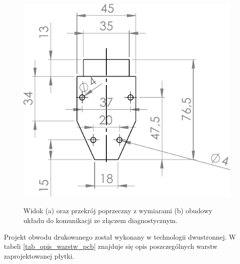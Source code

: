 \documentclass[12pt]{article} %
\numberwithin{equation}{subsection}
\numberwithin{figure}{section}
\numberwithin{table}{section}
\begin{document}
\begin{figure}[!h]
{				\includegraphics[scale=1]{Images/wymiary_wtyczka_obd.pdf}
			} 
			\caption{Widok (a) oraz przekrój poprzeczny z wymiarami (b) obudowy układu do komunikacji ze złączem diagnostycznym.}
			\label{widok_wtyczka_obd}
		\end{figure} 
	
	Projekt obwodu drukowanego został wykonany w technologii dwustronnej. W tabeli \ref{tab_opis_warstw_pcb} znajduje się opis poszczególnych warstw zaprojektowanej płytki.
	
\end{document}
